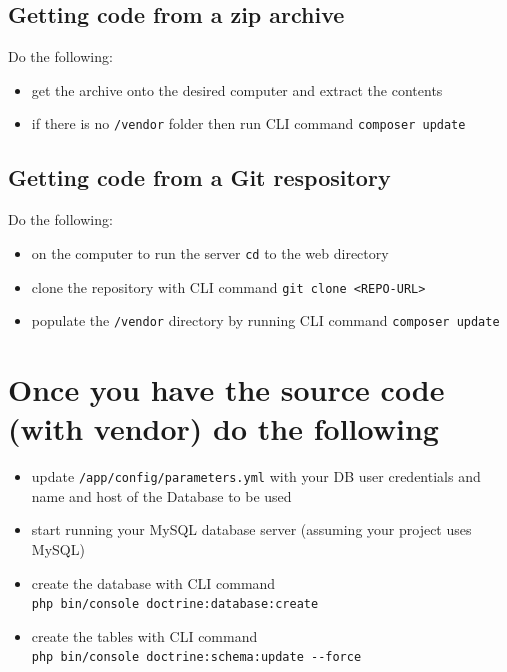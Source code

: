 \documentclass[a4paperpaper,openright]{book}
\providecommand{\tightlist}{%
  \setlength{\itemsep}{0pt}\setlength{\parskip}{0pt}}
\begin{document}
\hypertarget{getting-code-from-a-zip-archive}{%
\subsection{Getting code from a zip
archive}\label{getting-code-from-a-zip-archive}}

Do the following:

\begin{itemize}
\tightlist
\item
  get the archive onto the desired computer and extract the contents
\item
  if there is no \texttt{/vendor} folder then run CLI command
  \texttt{composer\ update}
\end{itemize}

\hypertarget{getting-code-from-a-git-respository}{%
\subsection{Getting code from a Git
respository}\label{getting-code-from-a-git-respository}}

Do the following:

\begin{itemize}
\tightlist
\item
  on the computer to run the server \texttt{cd} to the web directory
\item
  clone the repository with CLI command
  \texttt{git\ clone\ \textless{}REPO-URL\textgreater{}}
\item
  populate the \texttt{/vendor} directory by running CLI command
  \texttt{composer\ update}
\end{itemize}

\hypertarget{once-you-have-the-source-code-with-vendor-do-the-following}{%
\section{Once you have the source code (with vendor) do the
following}\label{once-you-have-the-source-code-with-vendor-do-the-following}}

\begin{itemize}
\tightlist
\item
  update \texttt{/app/config/parameters.yml} with your DB user
  credentials and name and host of the Database to be used
\item
  start running your MySQL database server (assuming your project uses
  MySQL)
\item
  create the database with CLI command
  \texttt{php\ bin/console\ doctrine:database:create}
\item
  create the tables with CLI command
  \texttt{php\ bin/console\ doctrine:schema:update\ -\/-force}
\end{itemize}
\end{document}
